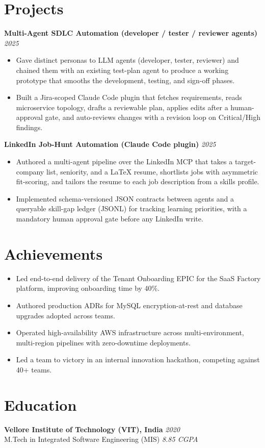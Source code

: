 \documentclass[11pt,a4paper]{article}
\begin{document}
\section{Projects}
\noindent\textbf{Multi-Agent SDLC Automation (developer / tester / reviewer agents)} \hfill \textit{2025}
\begin{itemize}
    \item Gave distinct personas to LLM agents (developer, tester, reviewer) and chained them with an existing test-plan agent to produce a working prototype that smooths the development, testing, and sign-off phases.
    \item Built a Jira-scoped Claude Code plugin that fetches requirements, reads microservice topology, drafts a reviewable plan, applies edits after a human-approval gate, and auto-reviews changes with a revision loop on Critical/High findings.
\end{itemize}
\noindent\textbf{LinkedIn Job-Hunt Automation (Claude Code plugin)} \hfill \textit{2025}
\begin{itemize}
    \item Authored a multi-agent pipeline over the LinkedIn MCP that takes a target-company list, seniority, and a LaTeX resume, shortlists jobs with asymmetric fit-scoring, and tailors the resume to each job description from a skills profile.
    \item Implemented schema-versioned JSON contracts between agents and a queryable skill-gap ledger (JSONL) for tracking learning priorities, with a mandatory human approval gate before any LinkedIn write.
\end{itemize}

\section{Achievements}
\vspace{0pt}
\begin{itemize}
    \item Led end-to-end delivery of the Tenant Onboarding EPIC for the SaaS Factory platform, improving onboarding time by 40\%.
    \item Authored production ADRs for MySQL encryption-at-rest and database upgrades adopted across teams.
    \item Operated high-availability AWS infrastructure across multi-environment, multi-region pipelines with zero-downtime deployments.
    \item Led a team to victory in an internal innovation hackathon, competing against 40+ teams.
\end{itemize}

\section{Education}
\noindent\textbf{Vellore Institute of Technology (VIT), India} \hfill \textit{2020}\\
M.Tech in Integrated Software Engineering (MIS) \hfill \textit{8.85 CGPA}
\end{document}
